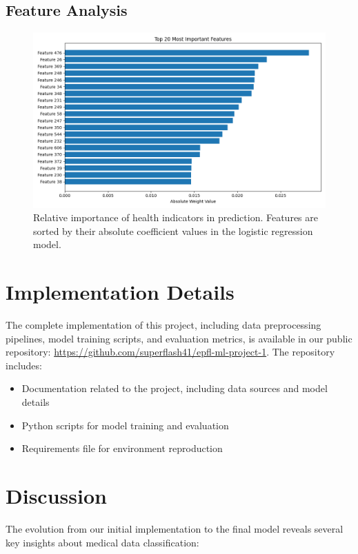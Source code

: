 \documentclass[10pt,conference,compsocconf]{IEEEtran}
\begin{document}
\subsection{Feature Analysis}
\begin{figure}[H]
    \centering
    \includegraphics[width=0.95\columnwidth]{figures/feature_importance.png}
    \caption{Relative importance of health indicators in prediction. 
    Features are sorted by their absolute coefficient values in the logistic regression model.}
    \label{fig:features}
\end{figure}

\section{Implementation Details}
The complete implementation of this project, including data preprocessing pipelines,
model training scripts, and evaluation metrics, is available in our public repository:
\url{https://github.com/superflash41/epfl-ml-project-1}. The repository includes:

\begin{itemize}
    \item Documentation related to the project, including data sources and model details
    \item Python scripts for model training and evaluation
    \item Requirements file for environment reproduction
\end{itemize}

\section{Discussion}

The evolution from our initial implementation to the final model reveals several key
insights about medical data classification:
\end{document}
